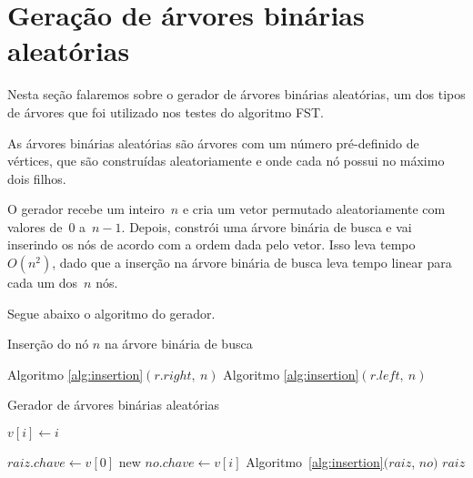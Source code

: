 \documentclass[a4paper,12pt]{article}
\begin{document}
\section {Geração de árvores binárias aleatórias}
	Nesta seção falaremos sobre o gerador de árvores binárias 
	aleatórias, um dos tipos de árvores que foi utilizado nos 
	testes do algoritmo FST.

	As árvores binárias aleatórias são árvores com um número 
	pré-definido de vértices, que são construídas aleatoriamente e 
	onde cada nó possui no máximo dois filhos.

	O gerador recebe um inteiro~$n$ e cria um vetor permutado 
	aleatoriamente com valores de~$0$ a~$n-1$.
	Depois, constrói uma árvore binária de busca e vai inserindo 
	os nós de acordo com a ordem dada pelo vetor.
	Isso leva tempo~$O(n^2)$, dado que a inserção na árvore 
	binária de busca leva tempo linear para cada um dos~$n$ nós.

	Segue abaixo o algoritmo do gerador.
	\bigskip
	\bigskip

	\begin{algorithm}[H]
	\label{alg:insertion}

		\caption{Inserção do nó $n$ na árvore binária de busca}
		\Output{}
		{
			{
				Algoritmo \ref{alg:insertion}$(r.right,~n)$\;
			}
		}
		{
			{
				Algoritmo \ref{alg:insertion}$(r.left, ~n)$\;
			}
		}

	\end{algorithm}	

	\bigskip

	\begin{algorithm}[H]
	\label{alg:ABAgenerator}

		\caption{Gerador de árvores binárias aleatórias}
		\bigskip
		{
			$v[i] \gets i$\;
		}

		\bigskip
		$raiz.chave\gets v[0]$\;
		{
			new $no.chave\gets v[i]$\;
			Algoritmo~\ref{alg:insertion}$(raiz$, $no)$\;
		}
		\Return $raiz$\;

	\end{algorithm}	
\end{document}
